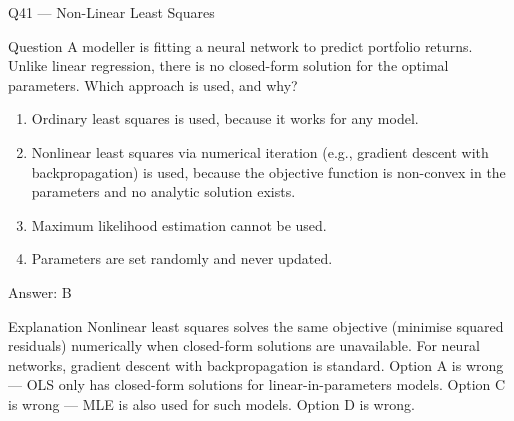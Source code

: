 \documentclass[aspectratio=169,8pt]{beamer}
\begin{document}
	\begin{frame}{Q41 --- Non-Linear Least Squares}
		\begin{block}{Question}
			A modeller is fitting a neural network to predict portfolio returns. Unlike linear regression, there is no closed-form solution for the optimal parameters. Which approach is used, and why?
		\end{block}
		\begin{enumerate}
			\item Ordinary least squares is used, because it works for any model.
			\item Nonlinear least squares via numerical iteration (e.g., gradient descent with backpropagation) is used, because the objective function is non-convex in the parameters and no analytic solution exists.
			\item Maximum likelihood estimation cannot be used.
			\item Parameters are set randomly and never updated.
		\end{enumerate}
		\begin{exampleblock}{Answer: B}\end{exampleblock}
		\begin{block}{Explanation}
			Nonlinear least squares solves the same objective (minimise squared residuals) numerically when closed-form solutions are unavailable. For neural networks, gradient descent with backpropagation is standard. Option A is wrong --- OLS only has closed-form solutions for linear-in-parameters models. Option C is wrong --- MLE is also used for such models. Option D is wrong.
		\end{block}
	\end{frame}
	
\end{document}
